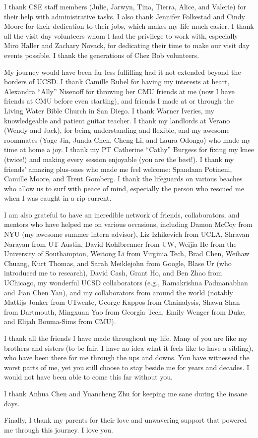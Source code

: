 \begin{acknowledgements}
I thank CSE staff members (Julie, Jarwyn, Tina, Tierra, Alice, and Valerie) for their help with administrative tasks. I also thank Jennifer Folkestad and Cindy Moore for their dedication to their jobs, which makes my life much easier. I thank all the visit day volunteers whom I had the privilege to work with, especially Miro Haller and Zachary Novack, for dedicating their time to make our visit day events possible. I thank the generations of Chez Bob volunteers.

My journey would have been far less fulfilling had it not extended beyond the borders of UCSD. I thank Camille Rubel for having my interests at heart, Alexandra ``Ally'' Nisenoff for throwing her CMU friends at me (now I have friends at CMU before even starting), and friends I made at or through the Living Water Bible Church in San Diego. I thank Warner Iveries, my knowledgeable and patient guitar teacher. I thank my landlords at Verano (Wendy and Jack), for being understanding and flexible, and my awesome roommates (Yage Jin, Junda Chen, Cheng Li, and Laura Odongo) who made my time at home a joy. I thank my PT Catherine ``Cathy'' Burgess for fixing my knee (twice!) and making every session enjoyable (you are the best!). I thank my friends' amazing plus-ones who made me feel welcome: Spandana Potineni, Camille Moore, and Trent Gomberg.
I thank the lifeguards on various beaches who allow us to surf with peace of mind, especially the person who rescued me when I was caught in a rip current. 


I am also grateful to have an incredible network of friends, collaborators, and mentors who have helped me on various occasions, including Damon McCoy from NYU (my awesome summer intern advisor), Liz Izhikevich from UCLA, Shravan Narayan from UT Austin, David Kohlbrenner from UW, Weijia He from the University of Southampton, Weitong Li from Virginia Tech, Brad Chen, Weihaw Chuang, Kurt Thomas, and Sarah Meiklejohn from Google, Blase Ur (who introduced me to research), David Cash, Grant Ho, and Ben Zhao from UChicago, my wonderful UCSD collaborators (e.g., Ramakrishna Padmanabhan and Jian Chen Yan), and my collaborators from around the world (notably Mattijs Jonker from UTwente, George Kappos from Chainalysis, Shawn Shan from Dartmouth, Mingxuan Yao from Georgia Tech, Emily Wenger from Duke, and Elijah Bouma-Sims from CMU).

I thank all the friends I have made throughout my life. Many of you are like my brothers and sisters (to be fair, I have no idea what it feels like to have a sibling), who have been there for me through the ups and downs. You have witnessed the worst parts of me, yet you still choose to stay beside me for years and decades. I would not have been able to come this far without you.

I thank Anhua Chen and Yuancheng Zhu for keeping me sane during the insane days.

Finally, I thank my parents for their love and unwavering support that powered me through this journey. I love you.



\end{acknowledgements}